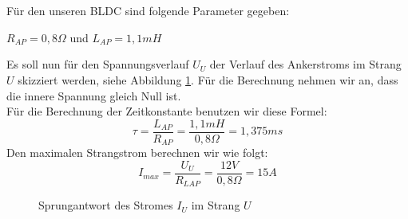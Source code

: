 \section{}\label{sec:2d}
Für den unseren BLDC sind folgende Parameter gegeben:
\begin{center}
	 $ R_{AP} = 0,8\Omega $ und $ L_{AP} = 1,1mH$\\
\end{center}
Es soll nun für den Spannungsverlauf $ U_{U} $ der Verlauf des Ankerstroms im Strang $ U $ skizziert werden, siehe Abbildung \ref{fig:2d:strom}. Für die Berechnung nehmen wir an, dass die innere Spannung gleich Null ist.\\
Für die Berechnung der Zeitkonstante benutzen wir diese Formel:\\
\begin{equation}
	\tau = \frac{L_{AP}}{R_{AP}} = \frac{1,1mH}{0,8\Omega} = 1,375ms
\end{equation}
Den maximalen Strangstrom berechnen wir wie folgt:
\begin{equation}
	I_{max} = \frac{U_{U}}{R_{LAP}} = \frac{12V}{0,8\Omega} = 15A
\end{equation}
\begin{figure}[h]
	\centering
	
	\label{fig:2d:strom}
	\caption{Sprungantwort des Stromes $ I_{U} $ im Strang $ U $}
\end{figure}



\clearpage

